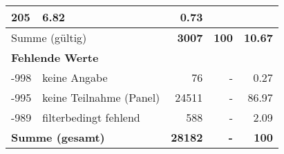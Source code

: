 \begin{longtable}{lXrrr}
       \num{205} &
       \num[round-mode=places,round-precision=2]{6,82} &
         \num[round-mode=places,round-precision=2]{0,73} \\
     \midrule
     \multicolumn{2}{l}{Summe (gültig)} &
       \textbf{\num{3007}} &
     \textbf{100} &
       \textbf{\num[round-mode=places,round-precision=2]{10,67}} \\
     \multicolumn{5}{l}{\textbf{Fehlende Werte}}\\
       -998 &
       keine Angabe &
         \num{76} &
        - &
         \num[round-mode=places,round-precision=2]{0,27} \\
       -995 &
       keine Teilnahme (Panel) &
         \num{24511} &
        - &
         \num[round-mode=places,round-precision=2]{86,97} \\
       -989 &
       filterbedingt fehlend &
         \num{588} &
        - &
         \num[round-mode=places,round-precision=2]{2,09} \\
     \midrule
     \multicolumn{2}{l}{\textbf{Summe (gesamt)}} &
          \textbf{\num{28182}} &
        \textbf{-} &
        \textbf{100} \\
     \bottomrule
     \end{longtable}
     
